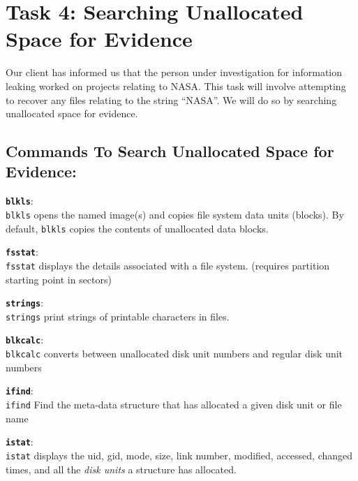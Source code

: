 \documentclass[a4paper,11pt]{article}
\begin{document}
\section{Task 4: Searching Unallocated Space for Evidence}
Our client has informed us that the person under investigation for information leaking worked on projects relating to NASA. This task will involve attempting to recover any files relating to the string ``NASA''. We will do so by searching unallocated space for evidence.

\subsection*{Commands To Search Unallocated Space for Evidence:}
\begin{itemize*}
	\item \textbf{\texttt{blkls}}:\\ \texttt{blkls} opens the named image(s) and copies file system data  units  (blocks).   By default,  \texttt{blkls} copies the contents of unallocated data blocks. 
	\item \textbf{\texttt{fsstat}}:\\ \texttt{fsstat} displays the details associated with a file system. (requires partition starting point in sectors)
	\item \textbf{\texttt{strings}}:\\ \texttt{strings} print strings of printable characters in files.
	\item \textbf{\texttt{blkcalc}}:\\ \texttt{blkcalc} converts between unallocated disk unit numbers and regular disk unit
       numbers
	\item \textbf{\texttt{ifind}}:\\ \texttt{ifind} Find the meta-data structure that has allocated a given disk unit or file
       name
		\item \textbf{\texttt{istat}}:\\ \texttt{istat}  displays the uid, gid, mode, size, link number, modified, accessed, changed times, and all the \textit{disk units} a structure has allocated.
\end{itemize*}
\end{document}
